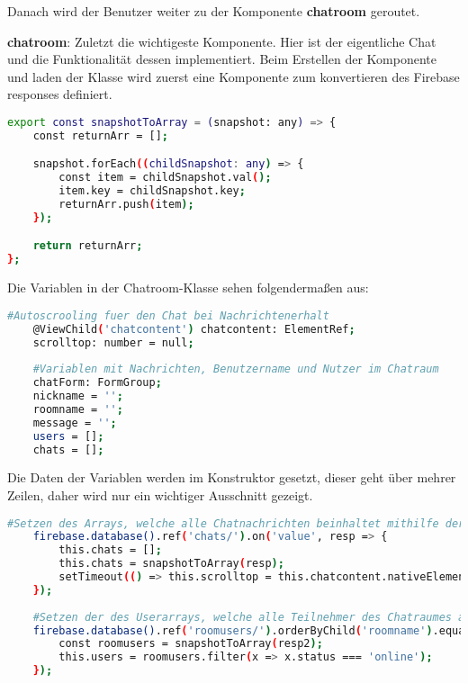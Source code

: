 Danach wird der Benutzer weiter zu der Komponente \textbf{chatroom} geroutet.

\textbf{chatroom}: Zuletzt die wichtigeste Komponente. Hier ist der eigentliche Chat und die Funktionalität dessen implementiert. Beim Erstellen der Komponente und laden der Klasse wird zuerst eine Komponente zum konvertieren
des Firebase responses definiert.

\begin{lstlisting}[language=bash]
    export const snapshotToArray = (snapshot: any) => {
    const returnArr = [];

    snapshot.forEach((childSnapshot: any) => {
        const item = childSnapshot.val();
        item.key = childSnapshot.key;
        returnArr.push(item);
    });

    return returnArr;
};
\end{lstlisting}

Die Variablen in der Chatroom-Klasse sehen folgendermaßen aus:

\begin{lstlisting}[language=bash]
    #Autoscrooling fuer den Chat bei Nachrichtenerhalt
    @ViewChild('chatcontent') chatcontent: ElementRef;
    scrolltop: number = null;
  
    #Variablen mit Nachrichten, Benutzername und Nutzer im Chatraum
    chatForm: FormGroup;
    nickname = '';
    roomname = '';
    message = '';
    users = [];
    chats = [];
\end{lstlisting}

Die Daten der Variablen werden im Konstruktor gesetzt, dieser geht über mehrer Zeilen, daher wird nur ein wichtiger Ausschnitt gezeigt.

\begin{lstlisting}[language=bash]
    #Setzen des Arrays, welche alle Chatnachrichten beinhaltet mithilfe der snapshot Konstante
    firebase.database().ref('chats/').on('value', resp => {
        this.chats = [];
        this.chats = snapshotToArray(resp);
        setTimeout(() => this.scrolltop = this.chatcontent.nativeElement.scrollHeight, 500);
    });
    
    #Setzen der des Userarrays, welche alle Teilnehmer des Chatraumes angibt
    firebase.database().ref('roomusers/').orderByChild('roomname').equalTo(this.roomname).on('value', (resp2: any) => {
        const roomusers = snapshotToArray(resp2);
        this.users = roomusers.filter(x => x.status === 'online');
    });
\end{lstlisting}


